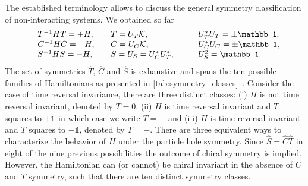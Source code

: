 \documentclass{svmono}
\begin{document}
The established terminology allows to discuss the general symmetry classification of non-interacting systems.
We obtained so far
\begin{align}
    \begin{array}{l l l l }
        & T^{-1}HT = +H
        ,\quad
        & T = U_T\mathcal K
        ,\quad
        & U_T^*U_T = \pm\mathbb1,\\
& C^{-1}HC = -H
        ,\quad
        & C = U_C\mathcal K
        ,\quad
        & U_C^*U_C = \pm\mathbb1,\\
& S^{-1}HS = -H
        ,\quad
        & S = U_S = U_C^* U^*_T
        ,\qquad
        & U_S^2 = \mathbb1.
    \end{array}
    \label{eq:symmetry_real_space}
\end{align}
The set of symmetries $\hat T$, $\hat C$ and $\hat S$ is exhaustive and spans the ten possible families of Hamiltonians as presented in \cref{tab:symmetry_classes}~\cite{Chiu2016}.
Consider the case of time reversal invariance, there are three distinct classes:
(i) $H$ is not time reversal invariant, denoted by $T=0$, (ii) $H$ is time reversal invariant and $T$ squares to $+\mathbb1$ in which case we write $T=+$ and (iii) $H$ is time reversal invariant and $T$ squares to $-\mathbb1$, denoted by $T=-$.
There are three equivalent ways to characterize the behavior of $H$ under the particle hole symmetry.
Since $\hat S = \hat C\hat T$ in eight of the nine previous possibilities the outcome of chiral symmetry is implied.
However, the Hamiltonian can (or cannot) be chiral invariant in the absence of $C$ and $T$ symmetry, such that there are ten distinct symmetry classes.
\end{document}
